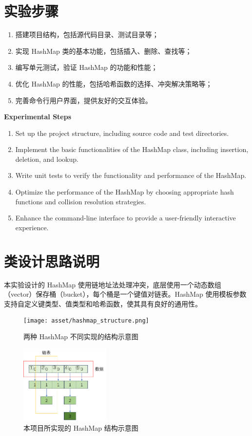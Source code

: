 \documentclass{article}
\begin{document}
    \section{实验步骤}
    \begin{enumerate}
        \item 搭建项目结构，包括源代码目录、测试目录等；
        \item 实现 HashMap 类的基本功能，包括插入、删除、查找等；
        \item 编写单元测试，验证 HashMap 的功能和性能；
        \item 优化 HashMap 的性能，包括哈希函数的选择、冲突解决策略等；
        \item 完善命令行用户界面，提供友好的交互体验。
    \end{enumerate}

    \bigskip
    \textbf{Experimental Steps}\\
    \begin{enumerate}
        \item Set up the project structure, including source code and test directories.
        \item Implement the basic functionalities of the HashMap class, including insertion, deletion, and lookup.
        \item Write unit tests to verify the functionality and performance of the HashMap.
        \item Optimize the performance of the HashMap by choosing appropriate hash functions and collision resolution strategies.
        \item Enhance the command-line interface to provide a user-friendly interactive experience.
    \end{enumerate}

\section{类设计思路说明}

本实验设计的 HashMap 使用链地址法处理冲突，底层使用一个动态数组（vector）保存桶（bucket），每个桶是一个键值对链表。HashMap 使用模板参数支持自定义键类型、值类型和哈希函数，使其具有良好的通用性。

\begin{figure}[h]
    \centering
    \texttt{[image: asset/hashmap\_structure.png]}
    \caption{两种 HashMap 不同实现的结构示意图}
\end{figure}

\begin{figure}[h]
    \centering
    \includegraphics[width=0.4\textwidth]{asset/our_hashmap.png}
    \caption{本项目所实现的 HashMap 结构示意图}
\end{figure}
\end{document}
